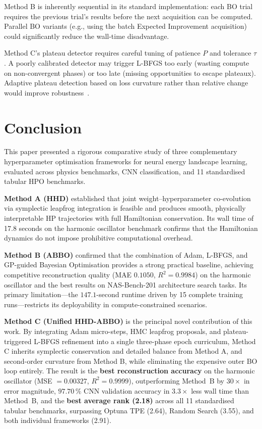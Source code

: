 \documentclass[11pt]{article}
\begin{document}
Method B is inherently sequential in its standard implementation:
each BO trial requires the previous trial's results before the next
acquisition can be computed.  Parallel BO variants (e.g., using the
batch Expected Improvement acquisition) could significantly reduce the
wall-time disadvantage.

Method C's plateau detector requires careful tuning of patience $P$
and tolerance $\tau$.  A poorly calibrated detector may trigger L-BFGS
too early (wasting compute on non-convergent phases) or too late
(missing opportunities to escape plateaux).  Adaptive plateau
detection based on loss curvature rather than relative change would
improve robustness~\cite{rathore2024}.


\section{Conclusion}

This paper presented a rigorous comparative study of three complementary
hyperparameter optimisation frameworks for neural energy landscape
learning, evaluated across physics benchmarks, CNN classification,
and 11 standardised tabular HPO benchmarks.

\textbf{Method A (HHD)} established that joint weight--hyperparameter
co-evolution via symplectic leapfrog integration is feasible and
produces smooth, physically interpretable HP trajectories with full
Hamiltonian conservation.  Its wall time of 17.8 seconds on the harmonic
oscillator benchmark confirms that the Hamiltonian dynamics do not
impose prohibitive computational overhead.

\textbf{Method B (ABBO)} confirmed that the combination of Adam,
L-BFGS, and GP-guided Bayesian Optimisation provides a strong practical
baseline, achieving competitive reconstruction quality (MAE $0.1050$,
$R^2 = 0.9984$) on the harmonic oscillator and the best results on
NAS-Bench-201 architecture search tasks.  Its primary limitation---the
$147.1$-second runtime driven by 15 complete training runs---restricts
its deployability in compute-constrained scenarios.

\textbf{Method C (Unified HHD-ABBO)} is the principal novel contribution
of this work.  By integrating Adam micro-steps, HMC leapfrog proposals,
and plateau-triggered L-BFGS refinement into a single three-phase
epoch curriculum, Method C inherits symplectic conservation and detailed
balance from Method A, and second-order curvature from Method B, while
eliminating the expensive outer BO loop entirely.  The result is the
\textbf{best reconstruction accuracy} on the harmonic oscillator
(MSE $= 0.00327$, $R^2 = 0.9999$), outperforming Method~B by
$30\times$ in error magnitude, $97.70\,\%$ CNN validation accuracy
in $3.3\times$ less wall time than Method~B, and the \textbf{best
average rank (2.18)} across all 11 standardised tabular benchmarks,
surpassing Optuna TPE (2.64), Random Search (3.55), and both individual
frameworks (2.91).
\end{document}
